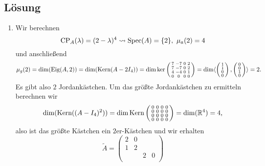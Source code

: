 \subsection{Lösung}
\begin{enumerate}
	\item Wir berechnen
		\begin{equation*}
			\text{CP}_A(\lambda) = (2 - \lambda)^4 \leadsto \text{Spec}(A) = \{ 2 \}, \ \mu_a(2) = 4
		\end{equation*}
		und anschließend
		\begin{equation*}
			\mu_g(2) = \dim(\text{Eig}(A,2)) = \dim(\text{Kern}(A - 2I_4)) = \dim\ker\left( \begin{smallmatrix}
				7 & -7 & 0 & 2 \\
				7 & -7 & 0 & 2 \\
				4 & -4 & 0 & 1 \\
				0 & 0 & 0 & 0
			\end{smallmatrix} \right) = \dim\langle \left( \begin{smallmatrix}
				1 \\ 1 \\ 0 \\ 0
			\end{smallmatrix} \right), \left( \begin{smallmatrix}
				0 \\ 0 \\ 1 \\ 0
			\end{smallmatrix} \right) \rangle = 2\text{.}
		\end{equation*}
		Es gibt also \( 2 \) Jordankästchen. Um das größte Jordankästchen zu ermitteln berechnen wir
		\begin{equation*}
			\dim(\text{Kern}((A - I_4)^2)) = \dim\text{Kern}\left( \begin{smallmatrix}
				0 & 0 & 0 & 0 \\
				0 & 0 & 0 & 0 \\
				0 & 0 & 0 & 0 \\
				0 & 0 & 0 & 0
			\end{smallmatrix} \right) = \dim(\mathbb{R}^4) = 4\text{,}
		\end{equation*}
		also ist das größte Kästchen ein \( 2 \)er-Kästchen und wir erhalten
		\begin{equation*}
			\widetilde{A} = \begin{pmatrix}
				2 & 0 & &  \\
				1 & 2 & &  \\
				 & & 2 & 0 \\

\end{pmatrix}
\end{equation*}
\end{enumerate}
